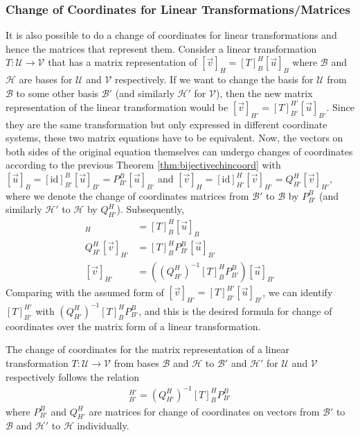 \subsubsection{Change of Coordinates for Linear Transformations/Matrices}

It is also possible to do a change of coordinates for linear transformations and hence the matrices that represent them. Consider a linear transformation $T: \mathcal{U} \to \mathcal{V}$ that has a matrix representation of $[\vec{v}]_H = [T]_B^H[\vec{u}]_B$ where $\mathcal{B}$ and $\mathcal{H}$ are bases for $\mathcal{U}$ and $\mathcal{V}$ respectively. If we want to change the basis for $\mathcal{U}$ from $\mathcal{B}$ to some other basis $\mathcal{B}'$ (and similarly $\mathcal{H}'$ for $\mathcal{V}$), then the new matrix representation of the linear transformation would be $[\vec{v}]_{H'} = [T]_{B'}^{H'}[\vec{u}]_{B'}$. Since they are the same transformation but only expressed in different coordinate systems, these two matrix equations have to be equivalent. Now, the vectors on both sides of the original equation themselves can undergo changes of coordinates according to the previous Theorem \ref{thm:bijectivechincoord} with $[\vec{u}]_B = [\text{id}]_{B'}^B [\vec{u}]_{B'} = P_{B'}^B [\vec{u}]_{B'}$ and $[\vec{v}]_{H} = [\text{id}]_{H'}^{H} [\vec{v}]_{H'} = Q_{H'}^H [\vec{v}]_{H'}$, where we denote the change of coordinates matrices from $\mathcal{B'}$ to $\mathcal{B}$ by $P_{B'}^{B}$ (and similarly $\mathcal{H'}$ to $\mathcal{H}$ by $Q_{H'}^{H}$). Subsequently,
\begin{align*}
[\vec{v}]_H &= [T]_B^H[\vec{u}]_B \\
Q_{H'}^H [\vec{v}]_{H'} &= [T]_B^H P_{B'}^B [\vec{u}]_{B'} \\
[\vec{v}]_{H'} &= \left( (Q_{H'}^H)^{-1} [T]_B^H P_{B'}^B \right) [\vec{u}]_{B'}
\end{align*}
Comparing with the assumed form of $[\vec{v}]_{H'} = [T]_{B'}^{H'}[\vec{u}]_{B'}$, we can identify $[T]_{B'}^{H'}$ with $(Q_{H'}^H)^{-1} [T]_B^H P_{B'}^B$, and this is the desired formula for change of coordinates over the matrix form of a linear transformation.
\begin{proper}
\label{proper:chcoordsmat}
The change of coordinates for the matrix representation of a linear transformation $T: \mathcal{U} \to \mathcal{V}$ from bases $\mathcal{B}$ and $\mathcal{H}$ to $\mathcal{B}'$ and $\mathcal{H}'$ for $\mathcal{U}$ and $\mathcal{V}$ respectively follows the relation
\begin{align*}
[T]_{B'}^{H'} = (Q_{H'}^H)^{-1} [T]_B^H P_{B'}^B
\end{align*}
where $P_{B'}^{B}$ and $Q_{H'}^{H}$ are matrices for change of coordinates on vectors from $\mathcal{B'}$ to $\mathcal{B}$ and $\mathcal{H'}$ to $\mathcal{H}$ individually.
\end{proper}
